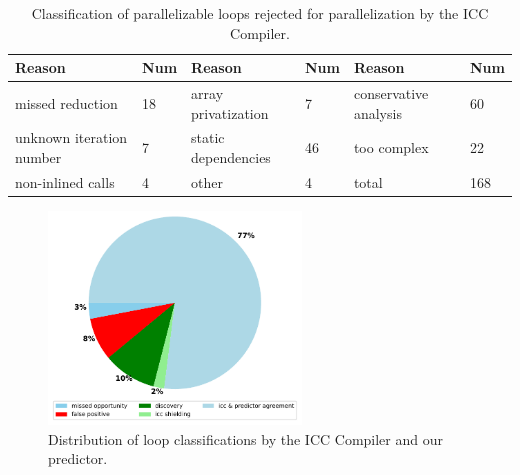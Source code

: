 \begin{table}
  \tabulinesep=2pt
  \begin{minipage}{\columnwidth}
  \begin{center}
    \begin{tabu}{M{3cm}M{0.5cm}M{3cm}M{0.5cm}M{3cm}M{0.5cm}}
      \hline
      \rowfont{\bfseries}
      Reason & Num & Reason & Num & Reason & Num\\\hline
      missed reduction & 18 & array privatization & 7 & conservative analysis & 60\\\hline
      unknown iteration number & 7 & static dependencies & 46 & too complex & 22\\\hline
      non-inlined calls & 4 & other & 4 & total & 168\\\hline
    \end{tabu}
  \end{center}
  \end{minipage}
  \caption{Classification of parallelizable loops rejected for parallelization by the ICC Compiler.}
  \label{tab:icc_missed_opportunities}
  \vspace*{-5mm}
\end{table}%
\begin{figure}[t!]
    \centering
    \includegraphics[width=0.6\textwidth]{images/pie.pdf}
    \caption{
      Distribution of loop classifications by the ICC Compiler and our predictor.}
    \label{fig:icc_competition}
\vspace*{-5mm}
\end{figure}
